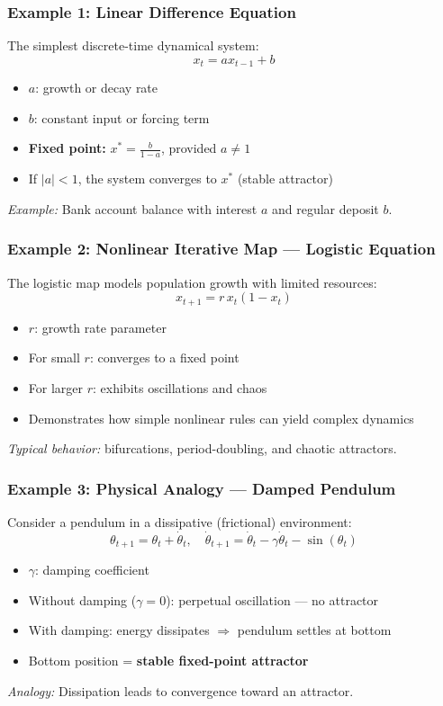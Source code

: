 \documentclass{beamer}
\begin{document}
\begin{frame}
    \frametitle{Example 1: Linear Difference Equation}

    The simplest discrete-time dynamical system:
    \[
    x_t = a x_{t-1} + b
    \]
    \begin{itemize}
        \item \(a\): growth or decay rate
        \item \(b\): constant input or forcing term
        \item \textbf{Fixed point:} \(x^* = \frac{b}{1-a}\), provided \(a \neq 1\)
        \item If \(|a| < 1\), the system converges to \(x^*\) (stable attractor)
    \end{itemize}

    \vspace{0.5em}
    \textit{Example:} Bank account balance with interest \(a\) and regular deposit \(b\).
\end{frame}

\begin{frame}
    \frametitle{Example 2: Nonlinear Iterative Map — Logistic Equation}

    The logistic map models population growth with limited resources:
    \[
    x_{t+1} = r\,x_t(1 - x_t)
    \]
    \begin{itemize}
        \item \(r\): growth rate parameter
        \item For small \(r\): converges to a fixed point
        \item For larger \(r\): exhibits oscillations and chaos
        \item Demonstrates how simple nonlinear rules can yield complex dynamics
    \end{itemize}

    \vspace{0.5em}
    \textit{Typical behavior:} bifurcations, period-doubling, and chaotic attractors.
\end{frame}

\begin{frame}
    \frametitle{Example 3: Physical Analogy — Damped Pendulum}

    Consider a pendulum in a dissipative (frictional) environment:
    \[
    \theta_{t+1} = \theta_t + \dot{\theta}_t, \quad
    \dot{\theta}_{t+1} = \dot{\theta}_t - \gamma \dot{\theta}_t - \sin(\theta_t)
    \]
    \begin{itemize}
        \item \(\gamma\): damping coefficient
        \item Without damping (\(\gamma = 0\)): perpetual oscillation — no attractor
        \item With damping: energy dissipates $\Rightarrow$ pendulum settles at bottom
        \item Bottom position = \textbf{stable fixed-point attractor}
    \end{itemize}

    \vspace{0.5em}
    \textit{Analogy:} Dissipation leads to convergence toward an attractor.
\end{frame}
\end{document}
